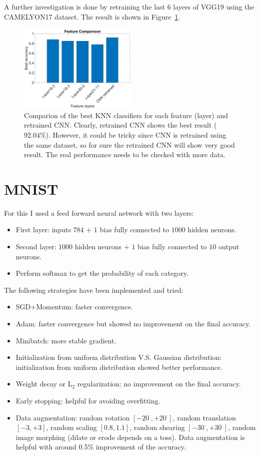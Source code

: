 \documentclass[a4paper]{article}
\begin{document}
A further investigation is done by retraining the last $6$ layers of VGG19 using the CAMELYON17 dataset. The result is shown in Figure~\ref{figknn3}.
	\begin{figure}[ht]
	\centering
	\includegraphics[width=0.5\textwidth]{figures/ex5_3.png}
	\caption{Comparion of the best KNN classifiers for each feature (layer) and retrained CNN. Clearly, retrained CNN shows the best result ($92.04\%$). However, it could be tricky since CNN is retrained using the same dataset, so for sure the retrained CNN will show very good result. The real performance needs to be checked with more data.}
	\label{figknn3}
\end{figure}

\section{MNIST}
For this I used a feed forward neural network with two layers:
\begin{itemize}
	\item First layer: inputs $784$ $+$ $1$ bias fully connected to $1000$ hidden neurons.
	\item Second layer: $1000$ hidden neurons $+$ $1$ bias fully connected to $10$ output neurons.
	\item Perform softmax to get the probability of each category.
\end{itemize}

The following strategies have been implemented and tried:
\begin{itemize}
	\item SGD+Momentum:  faster convergence.
	\item Adam:  faster convergence but showed no improvement on the final accuracy.
	\item Minibatch: more stable gradient.
	\item Initialization from uniform distribution V.S. Gaussian distribution: initialization from uniform distribution showed better performance.
	\item Weight decay or L$_2$ regularization: no improvement on the final accuracy.
	\item Early stopping: helpful for avoiding overfitting.
	\item Data augmentation: random rotation $[-20^{\cdot},+20^{\cdot}]$, random translation $[-3,+3]$, random scaling $[0.8,1.1]$, random shearing $[-30^{\cdot},+30^{\cdot}]$, random image morphing (dilate or erode depends on a toss). Data augmentation is helpful with around 0.5\% improvement of the accuracy.
\end{itemize}
\end{document}
